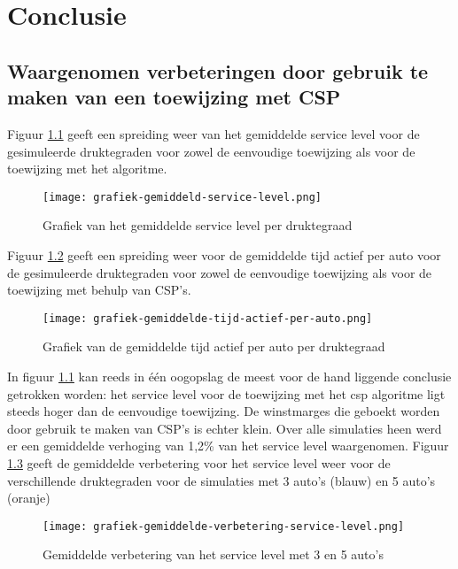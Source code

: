 
\chapter{Conclusie}
\label{ch:conclusie}

\section{Waargenomen verbeteringen door gebruik te maken van een toewijzing met CSP}
Figuur \ref{grafiek:gemiddeld-service-level} geeft een spreiding weer van het gemiddelde service level voor de gesimuleerde druktegraden voor zowel de eenvoudige toewijzing als voor de toewijzing met het algoritme. 
\begin{figure}[h]
	\texttt{[image: grafiek-gemiddeld-service-level.png]}
	\caption[Grafiek van het gemiddelde service level per druktegraad]{Grafiek van het gemiddelde service level per druktegraad}
	\label{grafiek:gemiddeld-service-level}
\end{figure}
Figuur \ref{grafiek:gemiddelde-tijd-actief-per-auto} geeft een spreiding weer voor de gemiddelde tijd actief per auto voor de gesimuleerde druktegraden voor zowel de eenvoudige toewijzing als voor de toewijzing met behulp van CSP's.
\begin{figure}[h]
	\texttt{[image: grafiek-gemiddelde-tijd-actief-per-auto.png]}
	\caption[Grafiek van de gemiddelde tijd actief per auto per druktegraad]{Grafiek van de gemiddelde tijd actief per auto per druktegraad}
	\label{grafiek:gemiddelde-tijd-actief-per-auto}
\end{figure}
In figuur \ref{grafiek:gemiddeld-service-level} kan reeds in één oogopslag de meest voor de hand liggende conclusie getrokken worden: het service level voor de toewijzing met het csp algoritme ligt steeds hoger dan de eenvoudige toewijzing. De winstmarges die geboekt worden door gebruik te maken van CSP's is echter klein. Over alle simulaties heen werd er een gemiddelde verhoging van 1,2\% van het service level waargenomen. Figuur \ref{grafiek:gemiddelde-verbetering-service-level} geeft de gemiddelde verbetering voor het service level weer voor de verschillende druktegraden voor de simulaties met 3 auto's (blauw) en 5 auto's (oranje)
\begin{figure}[h]
	\texttt{[image: grafiek-gemiddelde-verbetering-service-level.png]}
	\caption[Grafiek van de gemiddelde verbetering van het service level]{Gemiddelde verbetering van het service level met 3 en 5 auto's}
	\label{grafiek:gemiddelde-verbetering-service-level}
\end{figure}
